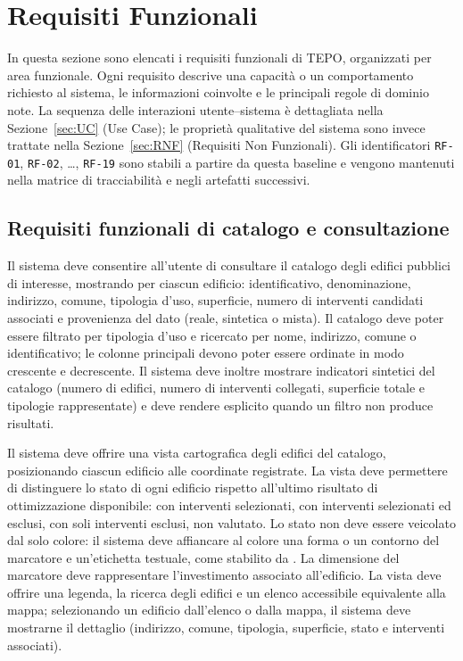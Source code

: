 \section{Requisiti Funzionali}
\label{sec:RF}

In questa sezione sono elencati i requisiti funzionali di TEPO, organizzati per area funzionale. Ogni requisito descrive una capacità o un comportamento richiesto al sistema, le informazioni coinvolte e le principali regole di dominio note. La sequenza delle interazioni utente--sistema è dettagliata nella Sezione~\ref{sec:UC} (Use Case); le proprietà qualitative del sistema sono invece trattate nella Sezione~\ref{sec:RNF} (Requisiti Non Funzionali). Gli identificatori \texttt{RF-01}, \texttt{RF-02}, \ldots, \texttt{RF-19} sono stabili a partire da questa baseline e vengono mantenuti nella matrice di tracciabilità e negli artefatti successivi.

\subsection{Requisiti funzionali di catalogo e consultazione}

 \label{rf:catalogo_edifici}
Il sistema deve consentire all'utente di consultare il catalogo degli edifici pubblici di interesse, mostrando per ciascun edificio: identificativo, denominazione, indirizzo, comune, tipologia d'uso, superficie, numero di interventi candidati associati e provenienza del dato (reale, sintetica o mista). Il catalogo deve poter essere filtrato per tipologia d'uso e ricercato per nome, indirizzo, comune o identificativo; le colonne principali devono poter essere ordinate in modo crescente e decrescente. Il sistema deve inoltre mostrare indicatori sintetici del catalogo (numero di edifici, numero di interventi collegati, superficie totale e tipologie rappresentate) e deve rendere esplicito quando un filtro non produce risultati.

 \label{rf:mappa}
Il sistema deve offrire una vista cartografica degli edifici del catalogo, posizionando ciascun edificio alle coordinate registrate. La vista deve permettere di distinguere lo stato di ogni edificio rispetto all'ultimo risultato di ottimizzazione disponibile: con interventi selezionati, con interventi selezionati ed esclusi, con soli interventi esclusi, non valutato. Lo stato non deve essere veicolato dal solo colore: il sistema deve affiancare al colore una forma o un contorno del marcatore e un'etichetta testuale, come stabilito da . La dimensione del marcatore deve rappresentare l'investimento associato all'edificio. La vista deve offrire una legenda, la ricerca degli edifici e un elenco accessibile equivalente alla mappa; selezionando un edificio dall'elenco o dalla mappa, il sistema deve mostrarne il dettaglio (indirizzo, comune, tipologia, superficie, stato e interventi associati).

